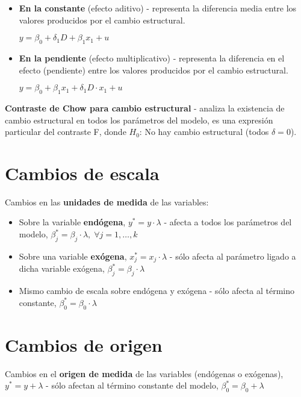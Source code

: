 \documentclass[10pt, a4paper, landscape]{article}
\begin{document}
\begin{multicols}{3}
\begin{itemize}[leftmargin=*]
	\item \textbf{En la constante} (efecto aditivo) - representa la diferencia media entre los valores producidos por el cambio estructural.
	\begin{center}
		\( y = \beta_{0} + \delta_{1} D + \beta_{1} x_{1} + u \)
	\end{center}
	\item \textbf{En la pendiente} (efecto multiplicativo) - representa la diferencia en el efecto (pendiente) entre los valores producidos por el cambio estructural.
	\begin{center}
		\( y = \beta_{0} + \beta_{1} x_{1} + \delta_{1} D \cdot x_{1} + u \)
	\end{center}
\end{itemize}

\textbf{Contraste de Chow para cambio estructural} - analiza la existencia de cambio estructural en todos los parámetros del modelo, es una expresión particular del contraste F, donde \( H_{0} \): No hay cambio estructural (todos \( \delta = 0 \)).

\section*{Cambios de escala}

Cambios en las \textbf{unidades de medida} de las variables:

\begin{itemize}[leftmargin=*]
	\item Sobre la variable \textbf{endógena}, \( y^{*} = y \cdot \lambda \) - afecta a todos los parámetros del modelo, \( \beta_{j}^{*} = \beta_{j} \cdot \lambda, \; \forall j = 1, \ldots, k \)
	\item Sobre una variable \textbf{exógena}, \( x_{j}^{*} = x_{j} \cdot \lambda \) - sólo afecta al parámetro ligado a dicha variable exógena, \( \beta_{j}^{*} = \beta_{j} \cdot \lambda \)
	\item Mismo cambio de escala sobre endógena y exógena - sólo afecta al término constante, \( \beta_{0}^{*} = \beta_{0} \cdot \lambda \)
\end{itemize}

\section*{Cambios de origen}

Cambios en el \textbf{origen de medida} de las variables (endógenas o exógenas), \( y^{*} = y + \lambda \) - sólo afectan al término constante del modelo, \( \beta_{0}^{*} = \beta_{0} + \lambda \)


\end{multicols}
\end{document}
